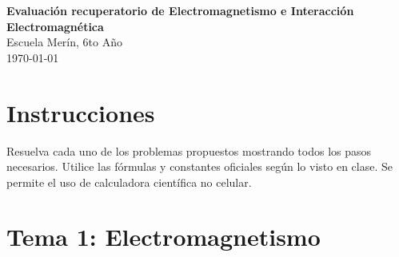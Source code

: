 \documentclass[a4paper,12pt]{article}
\begin{document}
\begin{center}
    \Large \textbf{Evaluación recuperatorio de Electromagnetismo e Interacción Electromagnética} \\
    \large Escuela Merín, 6to Año \\
    \today
\end{center}
\vspace{1cm}

\section*{Instrucciones}
Resuelva cada uno de los problemas propuestos mostrando todos los pasos necesarios. Utilice las fórmulas y constantes oficiales según lo visto en clase. Se permite el uso de calculadora científica no celular.



\section*{Tema 1: Electromagnetismo}
\end{document}

